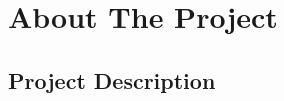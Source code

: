 \documentclass{sig-alternate-05-2015}
\begin{document}






%
%
%	
%
%
%
%	
%        	 	


\section{About The Project}
\label{sec:aboutproject}



\subsection{Project Description}
\end{document}
